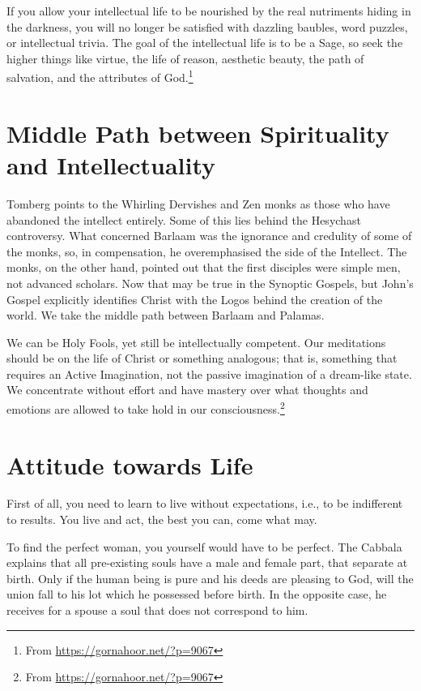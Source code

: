 If you allow your intellectual life to be nourished by the real nutriments hiding in the darkness, you will no longer be satisfied with dazzling baubles, word puzzles, or intellectual trivia. The goal of the intellectual life is to be a Sage, so seek the higher things like virtue, the life of reason, aesthetic beauty, the path of salvation, and the attributes of God.\footnote{From \url{https://gornahoor.net/?p=9067}}

\section{Middle Path between Spirituality and Intellectuality}

Tomberg points to the Whirling Dervishes and Zen monks as those who have abandoned the intellect entirely. Some of this lies behind the Hesychast controversy. What concerned Barlaam was the ignorance and credulity of some of the monks, so, in compensation, he overemphasised the side of the Intellect. The monks, on the other hand, pointed out that the first disciples were simple men, not advanced scholars. Now that may be true in the Synoptic Gospels, but John’s Gospel explicitly identifies Christ with the Logos behind the creation of the world. We take the middle path between Barlaam and Palamas.

We can be Holy Fools, yet still be intellectually competent. Our meditations should be on the life of Christ or something analogous; that is, something that requires an Active Imagination, not the passive imagination of a dream-like state. We concentrate without effort and have mastery over what thoughts and emotions are allowed to take hold in our consciousness.\footnote{From \url{https://gornahoor.net/?p=9067}}

\section{Attitude towards Life}

First of all, you need to learn to live without expectations, i.e., to be indifferent to results. You live and act, the best you can, come what may.

To find the perfect woman, you yourself would have to be perfect. The Cabbala explains that all pre-existing souls have a male and female part, that separate at birth. Only if the human being is pure and his deeds are pleasing to God, will the union fall to his lot which he possessed before birth. In the opposite case, he receives for a spouse a soul that does not correspond to him.

